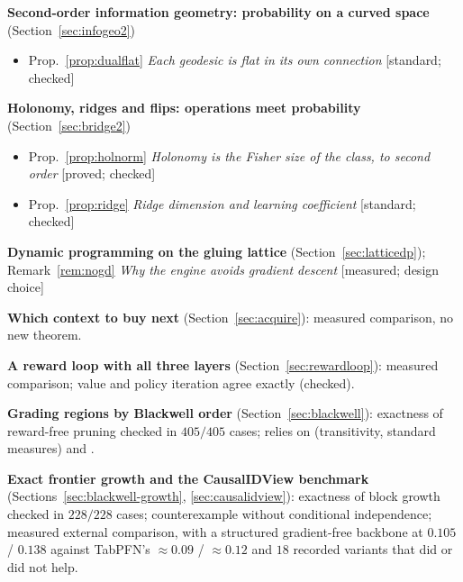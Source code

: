 \documentclass[11pt]{article}
\theoremstyle{definition}
\theoremstyle{remark}
\begin{document}
\noindent\textbf{Second-order information geometry: probability on a curved space} (Section~\ref{sec:infogeo2})
\begin{itemize}[itemsep=0pt]
  \item Prop.~\ref{prop:dualflat} \emph{Each geodesic is flat in its own connection} [standard; checked]
\end{itemize}
\noindent\textbf{Holonomy, ridges and flips: operations meet probability} (Section~\ref{sec:bridge2})
\begin{itemize}[itemsep=0pt]
  \item Prop.~\ref{prop:holnorm} \emph{Holonomy is the Fisher size of the class, to second order} [proved; checked]
  \item Prop.~\ref{prop:ridge} \emph{Ridge dimension and learning coefficient} [standard; checked]
\end{itemize}
\noindent\textbf{Dynamic programming on the gluing lattice} (Section~\ref{sec:latticedp}); Remark~\ref{rem:nogd} \emph{Why the engine avoids gradient descent} [measured; design choice]

\noindent\textbf{Which context to buy next} (Section~\ref{sec:acquire}): measured comparison, no new theorem.

\noindent\textbf{A reward loop with all three layers} (Section~\ref{sec:rewardloop}): measured comparison; value and policy iteration agree exactly (checked).

\noindent\textbf{Grading regions by Blackwell order} (Section~\ref{sec:blackwell}): exactness of reward-free pruning checked in $405/405$ cases; relies on \cite{bohinenperrone25} (transitivity, standard measures) and \cite{blackwell53}.

\noindent\textbf{Exact frontier growth and the CausalIDView benchmark} (Sections~\ref{sec:blackwell-growth}, \ref{sec:causalidview}): exactness of block growth checked in $228/228$ cases; counterexample without conditional independence; measured external comparison, with a structured gradient-free backbone at $0.105$ / $0.138$ against TabPFN's $\approx0.09$ / $\approx0.12$ and $18$ recorded variants that did or did not help.
\end{document}
